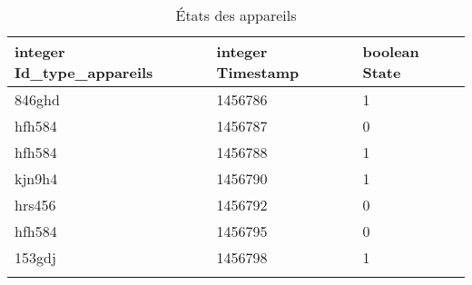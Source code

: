 \documentclass[10pt,a4paper]{article}
\begin{document}
\begin{table}[h!]
\centering
    \begin{tabular}{|l|l|l|}
    \hline
    \rowcolor[HTML]{EFEFEF} 
    integer Id\_type\_appareils & integer Timestamp & boolean State \\ \hline
    846ghd                               & 1456786           & 1             \\ \hline
    hfh584                               & 1456787           & 0             \\ \hline
    hfh584                               & 1456788           & 1             \\ \hline
    kjn9h4                               & 1456790           & 1             \\ \hline
    hrs456                               & 1456792           & 0             \\ \hline
    hfh584                               & 1456795           & 0             \\ \hline
    153gdj                               & 1456798           & 1             \\ \hline
                                    &                   &              
    \end{tabular}
    \caption{États des appareils}
\end{table}
\end{document}
